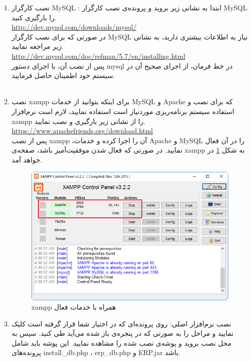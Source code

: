 \begin{enumerate}
	\item نصب کارگزار MySQL :
	ابتدا به نشانی زیر بروید و پرونده‌ی نصب کارگزار MySQL را بارگیری کنید.\\
\url{http://dev.mysql.com/downloads/mysql/}\\


در صورتی که برای نصب کارگزار MySQL نیاز به اطلاعات بیشتری دارید، به نشانی زیر مراجعه نمایید.\\
\url{http://dev.mysql.com/doc/refman/5.7/en/installing.html}\\

	پس از نصب آن، با اجرای دستور mysql در خط فرمان، از اجرای صحیح آن در سیستم خود اطمینان حاصل فرمایید.\\	\\	
	
	
	\item نصب xampp
	برای اینکه بتوانید از خدمات MySQL و Apache که برای نصب و استفاده سیستم برنامه‌ریزی موردنیاز است استفاده نمایید، لازم است نرم‌افزار xampp را از نشانی زیر بارگیری و نصب نمایید.\\
\url{https://www.apachefriends.org/download.html}\\
	
	پس از نصب  xampp ،آن را اجرا کرده و خدمات Apache و MySQL را در آن فعال نمایید. در صورتی که فعال شدن موفقیت‌آمیز باشد، صفحه‌ی xampp به شکل
	\ref{f13}
	در خواهد آمد.
	
		\begin{figure}[H]
			\centering
			\includegraphics[scale=0.7]{img/install/xampp}
			\caption{xampp همراه با خدمات فعال}
			\label{f13}
		\end{figure}
		
		
	\item نصب نرم‌افزار اصلی: روی پرونده‌ای که در اختیار شما قرار گرفته است کلیک نمایید و مراحل را به صورتی که در پنجره‌ی باز شده می‌آید طی کنید.
سپس به محل نصب بروید و پوشه‌ی نصب شده را مشاهده نمایید. این پوشه باید شامل پرونده‌های install\_db.php ، erp\_db.php و ERP.jar باشد.


\end{enumerate}
